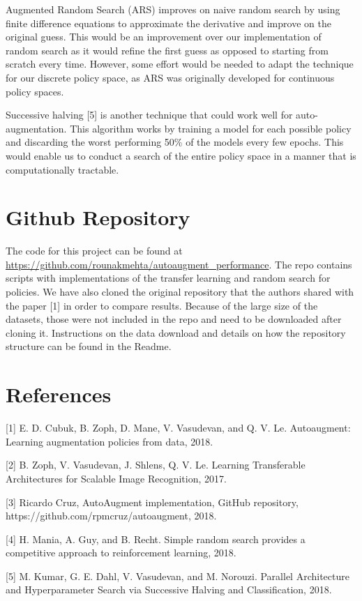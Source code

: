 \documentclass[10pt,twocolumn,letterpaper]{article}
\begin{document}
Augmented Random Search (ARS) improves on naive random search by using finite difference equations to approximate the derivative and improve on the original guess. This would be an improvement over our implementation of random search as it would refine the first guess as opposed to starting from scratch every time. However, some effort would be needed to adapt the technique for our discrete policy space, as ARS was originally developed for continuous policy spaces.

Successive halving [5] is another technique that could work well for auto-augmentation. This algorithm works by training a model for each possible policy and discarding the worst performing 50\% of the models every few epochs. This would enable us to conduct a search of the entire policy space in a manner that is computationally tractable.

\section{Github Repository}

The code for this project can be found at \url{https://github.com/rounakmehta/autoaugment_performance}. The repo contains scripts with implementations of the transfer learning and random search for policies. We have also cloned the original repository that the authors shared with the paper [1] in order to compare results. Because of the large size of the datasets, those were not included in the repo and need to be downloaded after cloning it. Instructions on the data download and details on how the repository structure can be found in the Readme.  

\section{References}

{\small



[1] E. D. Cubuk, B. Zoph, D. Mane, V. Vasudevan, and Q. V. Le. Autoaugment:   Learning  augmentation  policies  from  data, 2018. \newline

[2] B. Zoph, V. Vasudevan, J. Shlens, Q. V. Le. Learning Transferable Architectures for Scalable Image Recognition, 2017. \newline

[3] Ricardo Cruz, AutoAugment implementation, GitHub repository, https://github.com/rpmcruz/autoaugment, 2018. \newline

[4] H. Mania, A. Guy, and B. Recht. Simple random search provides a competitive approach to reinforcement learning, 2018.\newline

[5] M. Kumar, G. E. Dahl, V. Vasudevan, and M. Norouzi. Parallel Architecture and Hyperparameter Search
via Successive Halving and Classification, 2018.\newline

}
\end{document}
